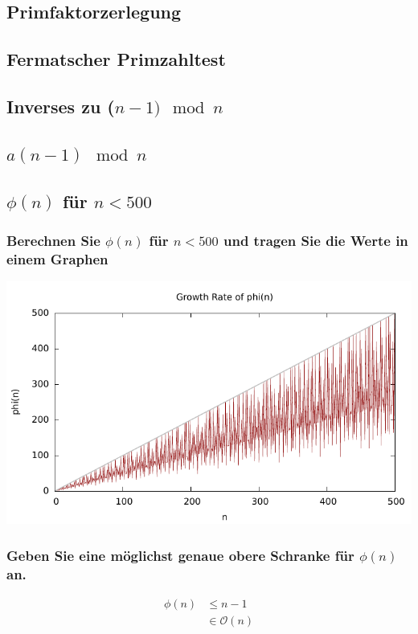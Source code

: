 \subsection{Primfaktorzerlegung}
\subsection{Fermatscher Primzahltest}
\subsection{Inverses zu ($n-1) \mod n$}
\subsection{$a(n-1) \mod n$}
\subsection{$\phi(n)$ für $n < 500$}

\subsubsection{Berechnen Sie $\phi(n)$ für $n < 500$ und tragen Sie die Werte in einem Graphen}

\includegraphics[scale=1]{eclipse/growth-rate.pdf}

\subsubsection{Geben Sie eine möglichst genaue obere Schranke für $\phi(n)$ an.}

\begin{align}
	 \phi(n) &\le n-1 \\
	 & \in \mathcal{O}(n)
\end{align}	
